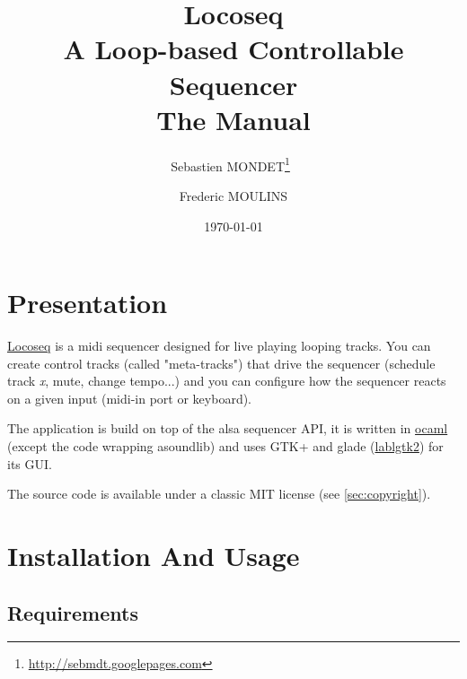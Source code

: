 

\title{
  \textbf{{\Huge Locoseq}\\
    A Loop-based Controllable Sequencer}\\
  The Manual}
\author{Sebastien MONDET\thanks{\url{http://sebmdt.googlepages.com}}\ \and
Frederic MOULINS}

\date{\today}






\maketitle
\tableofcontents

\newpage

\section{Presentation}

\href{http://locoseq.googlecode.com}{Locoseq} is a midi sequencer designed for
live playing looping tracks.  You can create control tracks (called
"meta-tracks") that drive the sequencer (schedule track \textit{x}, mute,
change tempo...) and you can configure how the sequencer reacts on a given
input (midi-in port or keyboard).


The application is build on top of the alsa sequencer API, it is written in
\href{http://www.ocaml.org}{ocaml}
(except the code wrapping asoundlib) and uses GTK+ and glade
(\href {http://wwwfun.kurims.kyoto-u.ac.jp/soft/lsl/lablgtk.html}{lablgtk2})
for its GUI.

The source code is available under a classic MIT license (see
\ref{sec:copyright}).



\section{Installation And Usage}

\subsection{Requirements}


